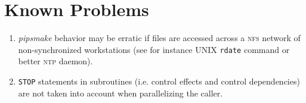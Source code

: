 \documentclass[a4paper]{report}
\begin{document}
\chapter{Known Problems}

\begin{enumerate}

\item {\em pipsmake} behavior may be erratic if files are accessed across
  a \textsc{nfs} network of non-synchronized workstations (see for
  instance UNIX \texttt{rdate} command or better \textsc{ntp} daemon).

\item \texttt{STOP} statements in subroutines (i.e. control effects and
control dependencies) are not taken into account when parallelizing the
caller.

\end{enumerate}





\newpage


\printindex
\end{document}
